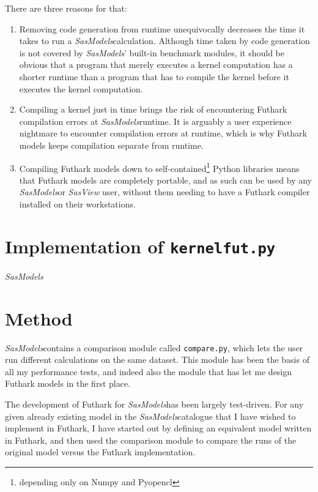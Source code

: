 \documentclass[11pt]{article}
\newcommand{\sasmodels}{\textit{SasModels}}
\newcommand{\sasview}{\textit{SasView}}
\begin{document}
There are three reasons for that:
\begin{enumerate}
  \item Removing code generation from runtime unequivocally decreases the time
  it takes to run a \sasmodels calculation. Although time taken by code 
  generation is not covered by \sasmodels' built-in benchmark modules, it should
  be obvious that a program that merely executes a kernel computation has a 
  shorter runtime than a program that has to compile the kernel before it
  executes the kernel computation.
  
  \item Compiling a kernel just in time brings the risk of encountering 
  Futhark compilation errors at \sasmodels runtime. 
  It is arguably a user experience nightmare to encounter compilation errors at 
  runtime, which is why Futhark models keeps compilation separate from runtime.
  
  \item Compiling Futhark models down to self-contained\footnote{depending only 
  on Numpy and Pyopencl} Python libraries means that Futhark models are 
  completely portable, and as such can be used by any \sasmodels or \sasview 
  user, without them needing to have a Futhark compiler installed on their 
  workstations.
\end{enumerate}

\section{Implementation of \texttt{kernelfut.py}}
\sasmodels 


\section{Method}

\sasmodels contains a comparison module called \texttt{compare.py}, which
lets the user run different calculations on the same dataset.
This module has been the basis of all my performance tests, and indeed also
the module that has let me design Futhark models in the first place.

The development of Futhark for \sasmodels has been largely test-driven.
For any given already existing model in the \sasmodels catalogue that I have
wished to implement in Futhark, I have started out by defining an equivalent
model written in Futhark, and then used the comparison module to compare the
 runs of the original model versus the Futhark implementation.
\end{document}
